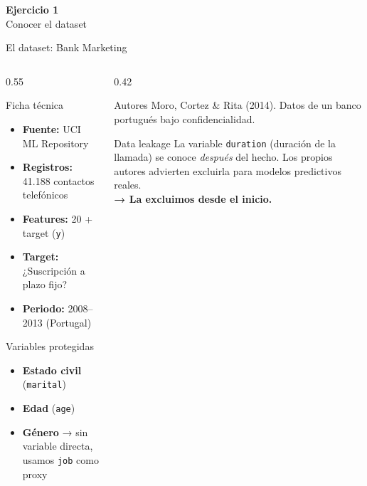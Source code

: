 \documentclass[aspectratio=169, 11pt]{beamer}
\begin{document}
{
\begin{frame}[plain]
\vfill
\begin{center}
{\color{white}\LARGE\bfseries Ejercicio 1}\\[8pt]
{\color{azulclaro}\large Conocer el dataset}
\end{center}
\vfill
\end{frame}
}

\begin{frame}{El dataset: Bank Marketing}
\begin{columns}[T]
\begin{column}{0.55\textwidth}
\begin{block}{Ficha técnica}
\begin{itemize}
\item \textbf{Fuente:} UCI ML Repository
\item \textbf{Registros:} 41.188 contactos telefónicos
\item \textbf{Features:} 20 + target (\texttt{y})
\item \textbf{Target:} ¿Suscripción a plazo fijo?
\item \textbf{Periodo:} 2008--2013 (Portugal)
\end{itemize}
\end{block}
\vspace{4pt}
\begin{alertblock}{Variables protegidas}
\begin{itemize}
\item \textbf{Estado civil} (\texttt{marital})
\item \textbf{Edad} (\texttt{age})
\item \textbf{Género} → sin variable directa, usamos \texttt{job} como proxy
\end{itemize}
\end{alertblock}
\end{column}
\begin{column}{0.42\textwidth}
\begin{block}{Autores}
Moro, Cortez \& Rita (2014). Datos de un banco portugués bajo confidencialidad.
\end{block}
\vspace{4pt}
\begin{block}{\faExclamationTriangle\quad Data leakage}
La variable \texttt{duration} (duración de la llamada) se conoce \emph{después} del hecho. Los propios autores advierten excluirla para modelos predictivos reales.\\[4pt]
\textbf{→ La excluimos desde el inicio.}
\end{block}
\end{column}
\end{columns}
\end{frame}
\end{document}
